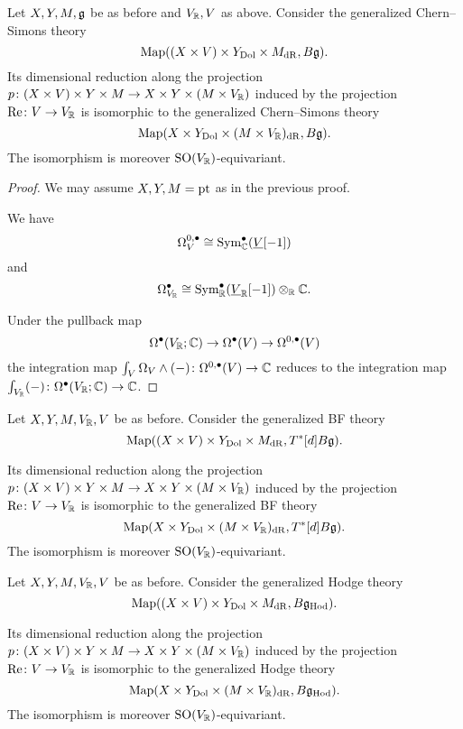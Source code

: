 \documentclass[10pt, oneside]{article}
\newcommand{\Hod}{\mathrm{Hod}}
\renewcommand{\Re}{\mathrm{Re}}
\begin{document}
\begin{prop} \label{CS_diml_red_prop}
Let $X,Y,M,\mathfrak g$ be as before and $V_\mathbb R, V$ as above. Consider the generalized Chern--Simons theory
\[\operatorname{Map}((X\times V)\times Y_{\mathrm{Dol}}\times M_{\mathrm{dR}}, B\mathfrak g).\]
Its dimensional reduction along the projection $p\colon (X\times V)\times Y\times M\rightarrow X\times Y\times (M\times V_\mathbb R)$ induced by the projection $\Re\colon V\rightarrow V_\RR$ is isomorphic to the generalized Chern--Simons theory
\[\operatorname{Map}(X\times Y_{\mathrm{Dol}}\times (M\times V_\mathbb R)_{\mathrm{dR}}, B\mathfrak g).\]
The isomorphism is moreover $\mathrm{SO}(V_\mathbb R)$-equivariant.
\end{prop}
\begin{proof}
We may assume $X,Y,M=\operatorname{pt}$ as in the previous proof.

We have
\[\Omega^{0, \bullet}_V\cong {\rm Sym}_\mathbb C^\bullet(\underline{V}[-1])\]
and
\[\Omega^\bullet_{V_\mathbb R}\cong {\rm Sym}_\mathbb R^\bullet(\underline{V}_\mathbb R[-1])\otimes_\mathbb R\mathbb C.\]

Under the pullback map
\[\Omega^\bullet(V_\mathbb R; \mathbb C)\rightarrow \Omega^\bullet(V)\rightarrow \Omega^{0, \bullet}(V)\]
the integration map $\int_V \Omega_V\wedge (-)\colon \Omega^{0, \bullet}(V)\rightarrow \mathbb C$ reduces to the integration map $\int_{V_\mathbb R} (-)\colon \Omega^{\bullet}(V_\mathbb R;\mathbb C)\rightarrow \mathbb C$.  
\end{proof}

\begin{cor}
Let $X, Y, M, V_\mathbb R, V$ be as before. Consider the generalized BF theory
\[\operatorname{Map}((X\times V)\times Y_{\mathrm{Dol}}\times M_{\mathrm{dR}}, T^*[d] B\mathfrak g).\]

Its dimensional reduction along the projection $p\colon (X\times V)\times Y\times M\rightarrow X\times Y\times (M\times V_\mathbb R)$ induced by the projection $\Re\colon V\rightarrow V_\RR$ is isomorphic to the generalized BF theory
\[\operatorname{Map}(X\times Y_{\mathrm{Dol}}\times (M\times V_\mathbb R)_{\mathrm{dR}}, T^*[d] B\mathfrak g).\]
The isomorphism is moreover $\mathrm{SO}(V_\mathbb R)$-equivariant.
\label{cor:BFholomorphicreduction}
\end{cor}

\begin{cor}
Let $X, Y, M, V_\mathbb R, V$ be as before. Consider the generalized Hodge theory
\[\map((X\times V)\times Y_{\mr{Dol}}\times M_{\mr{dR}}, B\fg_\Hod).\]

Its dimensional reduction along the projection $p\colon (X\times V)\times Y\times M\rightarrow X\times Y\times (M\times V_\mathbb R)$ induced by the projection $\Re\colon V\rightarrow V_\RR$ is isomorphic to the generalized Hodge theory
\[\map(X\times Y_{\mr{Dol}}\times (M\times V_\RR)_{\mr{dR}}, B\fg_\Hod).\]
The isomorphism is moreover $\mathrm{SO}(V_\mathbb R)$-equivariant.
\label{cor:Hodgeholomorphicreduction}
\end{cor}
\end{document}
